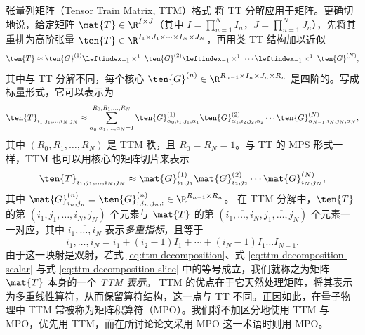 张量列矩阵（Tensor Train Matrix, TTM）格式 \cite{oseledets2010ttm} 将 TT 分解应用于矩阵。更确切地说，给定矩阵 $\mat{T}\in\R^{I\times J}$（其中 $I=\prod_{n=1}^N I_n$，$J=\prod_{n=1}^N J_n$），先将其重排为高阶张量 $\ten{T} \in \R^{I_1 \times J_1 \times \dots \times I_N \times J_N}$，再用类 TT 结构加以近似
\begin{equation}
\label{eq:ttm-decomposition}
    \ten{T} \approx \ten{G}^{(1)} \leftindex_{-1} \times^{1} \ \ten{G}^{(2)} \leftindex_{-1} \times^{1} \ \cdots \leftindex_{-1} \times^{1} \ \ten{G}^{(N)},
\end{equation}
其中与 TT 分解不同，每个核心 $\ten{G}^{(n)} \in \R^{R_{n-1} \times I_n \times J_n \times R_n}$ 是四阶的。写成标量形式，它可以表示为
\begin{equation}
\label{eq:ttm-decomposition-scalar}
  \ten{T}_{i_1, j_1,\ldots,i_N ,j_N} \approx \sum_{\alpha_0, \alpha_1, \dots, \alpha_N=1}^{R_0, R_1, \ldots, R_N} \ten{G}^{(1)}_{\alpha_0, i_1, j_1, \alpha_1} \ten{G}^{(2)}_{\alpha_1, i_2, j_2, \alpha_2} \cdots\ten{G}^{(N)}_{\alpha_{N-1},i_N,j_N, \alpha_N},
\end{equation}
其中 $(R_0, R_1, \ldots, R_N)$ 是 TTM 秩，且 $R_0=R_N=1$。与 TT 的 MPS 形式一样，TTM 也可以用核心的矩阵切片来表示
\begin{equation}
\label{eq:ttm-decomposition-slice}
  \ten{T}_{i_1, j_1,\dots, i_N, j_N} \approx \mat{G}^{(1)}_{i_1, j_1}\mat{G}^{(2)}_{i_2, j_2}\cdots\mat{G}^{(N)}_{i_N, j_N},
\end{equation}
其中 $\mat{G}^{(n)}_{i_n, j_n} = \ten{G}^{(n)}_{:, i_n, j_n, :} \in\R^{R_{n-1}\times R_n}$。
在 TTM 分解中，$\ten{T}$ 的第 $(i_1, j_1, \ldots, i_N, j_N)$ 个元素与 $\mat{T}$ 的第 $(\overline{i_1, \ldots, i_N}, \overline{j_1, \ldots, j_N})$ 个元素一一对应，其中 $\overline{i_1, \ldots, i_N}$ 表示\emph{多重指标}，且等于
\begin{equation*}
\overline{i_1, \ldots, i_N} = i_1 + (i_2 - 1)I_1 + \cdots + (i_N - 1)I_1 \ldots I_{N - 1}.
\end{equation*}
由于这一映射是双射，若式 \eqref{eq:ttm-decomposition}、式 \eqref{eq:ttm-decomposition-scalar} 与式 \eqref{eq:ttm-decomposition-slice} 中的等号成立，我们就称之为矩阵 $\mat{T}$ 本身的一个 \emph{TTM 表示}。
TTM 的优点在于它天然处理矩阵，将其表示为多重线性算符，从而保留算符结构，这一点与 TT 不同。正因如此，在量子物理中 TTM 常被称为矩阵积算符（MPO）\cite{schollwock2011dmrg}。我们将不加区分地使用 TTM 与 MPO，优先用 TTM，而在所讨论论文采用 MPO 这一术语时则用 MPO。

